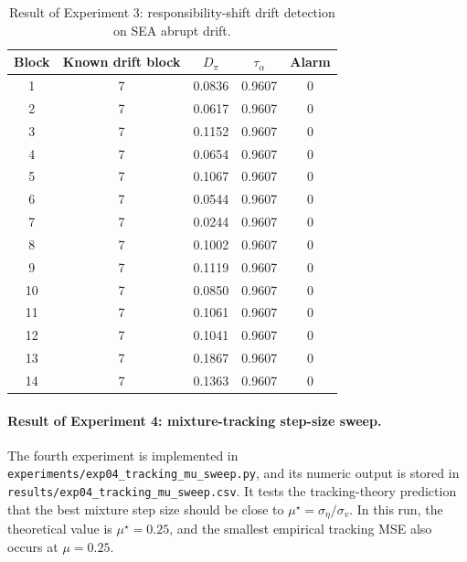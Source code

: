 ﻿\documentclass[12pt,a4paper]{article}
\begin{document}
\begin{table}[H]
\centering
\caption{Result of Experiment 3: responsibility-shift drift detection on SEA abrupt drift.}
\label{tab:exp03_drift_detection_result}
\renewcommand{\arraystretch}{1.15}
\begin{tabular}{ccccc}
\toprule
\textbf{Block} & \textbf{Known drift block} & \textbf{$D_\pi$} & \textbf{$\tau_\alpha$} & \textbf{Alarm}\\
\midrule
1 & 7 & 0.0836 & 0.9607 & 0\\
2 & 7 & 0.0617 & 0.9607 & 0\\
3 & 7 & 0.1152 & 0.9607 & 0\\
4 & 7 & 0.0654 & 0.9607 & 0\\
5 & 7 & 0.1067 & 0.9607 & 0\\
6 & 7 & 0.0544 & 0.9607 & 0\\
7 & 7 & 0.0244 & 0.9607 & 0\\
8 & 7 & 0.1002 & 0.9607 & 0\\
9 & 7 & 0.1119 & 0.9607 & 0\\
10 & 7 & 0.0850 & 0.9607 & 0\\
11 & 7 & 0.1061 & 0.9607 & 0\\
12 & 7 & 0.1041 & 0.9607 & 0\\
13 & 7 & 0.1867 & 0.9607 & 0\\
14 & 7 & 0.1363 & 0.9607 & 0\\
\bottomrule
\end{tabular}
\end{table}

\paragraph{Result of Experiment 4: mixture-tracking step-size sweep.}
The fourth experiment is implemented in
\texttt{experiments/exp04\_tracking\_mu\_sweep.py}, and its numeric output is
stored in \texttt{results/exp04\_tracking\_mu\_sweep.csv}. It tests the
tracking-theory prediction that the best mixture step size should be close to
$\mu^\star=\sigma_\eta/\sigma_v$. In this run, the theoretical value is
$\mu^\star=0.25$, and the smallest empirical tracking MSE also occurs at
$\mu=0.25$.
\end{document}
